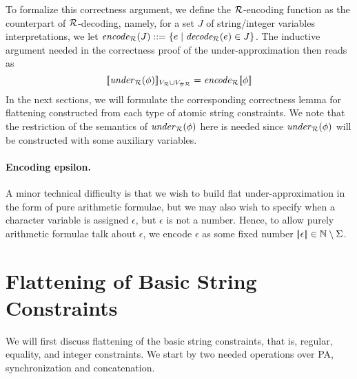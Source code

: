 \documentclass[sigplan,review,anonymous]{acmart}\settopmatter{printfolios=true,printccs=false,printacmref=false}
\begin{document}
To formalize this correctness argument, we define the $\mathcal{R}$-encoding function as the counterpart of $\mathcal{R}$-decoding,  
%
namely, for a set $J$ of string/integer variables interpretations,  
we let $\mathit{encode}_{\mathcal{R}} (J) ::= \{e\mid \mathit{decode_{\mathcal{R}}} (e) \in J\}$.
%
%
%
%
The inductive argument needed in the correctness proof of the under-approximation then reads as
$$[\![\mathit{under}_{\mathcal{R}}(\phi)]\!]_{V_{\mathcal{R}}\cup V_{\#\mathcal{R}}}  = \mathit{encode}_{\mathcal{R}}{[\![\phi]\!]}$$ 
%
In the next sections, 
we will formulate the corresponding correctness lemma for flattening constructed from each type of atomic string constraints.
%
We note that the restriction of the semantics of $\mathit{under}_{\mathcal{R}}(\phi)$ here is needed since $\mathit{under}_{\mathcal{R}}(\phi)$ will be constructed with some auxiliary variables. 


\paragraph{Encoding epsilon.}
A minor technical difficulty is that we wish to build flat under-approximation in the form of pure arithmetic formulae, 
but we may also wish to specify when a character variable is assigned $\epsilon$, but $\epsilon$ is not a number. 
Hence, to allow purely arithmetic formulae talk about $\epsilon$, 
we encode $\epsilon$ as some fixed number $|\!|\epsilon|\!|\in\mathbb{N}\setminus\Sigma$.

\section{Flattening of Basic String Constraints}
\label{sec:flattening}
We will first discuss flattening of the basic string constraints, that is,
regular, equality, and integer constraints. We start by two needed operations over PA, synchronization and concatenation.
\end{document}
